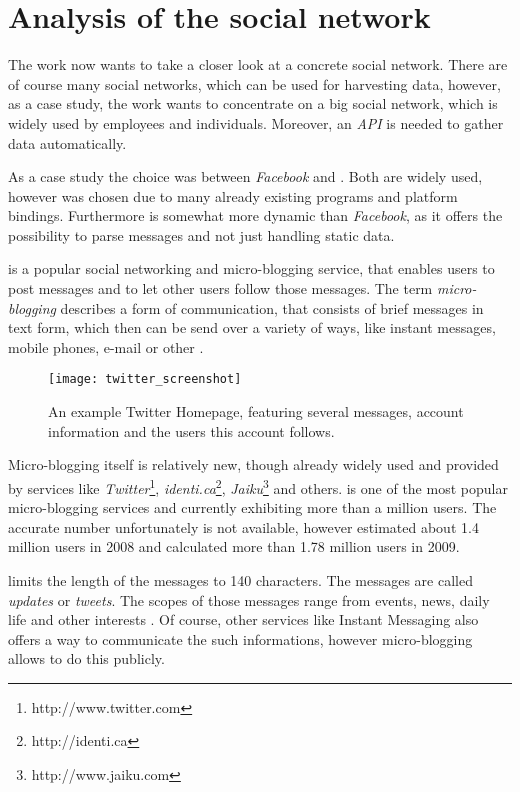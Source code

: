\chapter{Analysis of the social network \Twitter}
\label{chapter:analysis}

The work now wants to take a closer look at a concrete social network.
There are of course many social networks, which can be used for harvesting
data, however, as a case study, the work wants to concentrate on a big social
network, which is widely used by employees and individuals. Moreover,
an \textit{API} is needed to gather data automatically.

As a case study the choice was between \textit{Facebook} and
\Twitter. Both are widely used, however \Twitter{} was chosen due to many
already existing programs and platform bindings. Furthermore \Twitter{} is
somewhat more dynamic than \textit{Facebook}, as it offers the possibility to
parse \Twitter{} messages and not just handling static data.

\Twitter{} is a popular social networking and micro-blogging service, that
enables users to post messages and to let other users follow those messages.
The term \textit{micro-blogging} describes a form of communication, that
consists of brief messages in text form, which then can be send over a variety
of ways, like instant messages, mobile phones, e-mail or other \cite{java2007}.

\begin{figure}[hbt]
  \centering
  \texttt{[image: twitter\_screenshot]}
  \caption{An example Twitter Homepage, featuring several \Twitter{}
  messages, account information and the users this account
  follows.}\label{fig:twitter_screenshot}
\end{figure}

Micro-blogging itself is relatively new, though already widely used and
provided by services like
\textit{Twitter}\footnote{http://www.twitter.com},
\textit{identi.ca}\footnote{http://identi.ca},
\textit{Jaiku}\footnote{http://www.jaiku.com} and others. \Twitter{} is one of
the most popular micro-blogging services \cite{java2007} and currently
exhibiting more than a million users. The accurate number unfortunately is not
available, however \cite{krishnamurthy2008} estimated about 1.4 million users
in 2008 and \cite{whitworth2009} calculated more than 1.78 million users in
2009.

\Twitter{} limits the length of the messages to 140 characters. The messages
are called \textit{updates} or \textit{tweets}.  The scopes of those messages
range from events, news, daily life and other interests \cite{java2007}. Of
course, other services like Instant Messaging also offers a way to communicate
the such informations, however micro-blogging allows to do this publicly.

